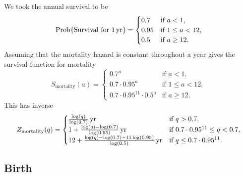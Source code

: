 \documentclass{article}
\DeclareMathOperator{\Prob}{Prob}
\begin{document}
We took the annual survival to be
\begin{equation}
  \Prob\{\text{Survival for $\unit[1]{yr}$}\}
  =
  \begin{cases}
    0.7 & \text{if $a < 1$},
    \\
    0.95 & \text{if $1 \leq a < 12$},
    \\
    0.5 & \text{if $a \geq 12$}.
  \end{cases}
\end{equation}
Assuming that the mortality hazard is constant throughout a year gives
the survival function for mortality
\begin{equation}
  S_{\text{mortality}}(a) =
  \begin{cases}
    0.7^a & \text{if $a < 1$},
    \\
    0.7 \cdot 0.95^a & \text{if $1 \leq a < 12$},
    \\
    0.7 \cdot 0.95^{11} \cdot 0.5^a & \text{if $a \geq 12$}.
  \end{cases}
\end{equation}
This has inverse
\begin{equation}
  Z_{\text{mortality}}(q) =
  \begin{cases}
    \unit[\frac{\log(q)}{\log(0.7)}]{yr} & \text{if $q > 0.7$},
    \\
    \unit[1 + \frac{\log(q) - \log(0.7)}{\log(0.95)}]{yr}
    & \text{if $0.7 \cdot 0.95^{11} \leq q < 0.7$},
    \\
    \unit[12 + \frac{\log(q) - \log(0.7) - 11 \log(0.95)}{\log(0.5)}]{yr}
    & \text{if $q \leq 0.7 \cdot 0.95^{11}$}.
  \end{cases}
\end{equation}


\subsection{Birth}
\end{document}

